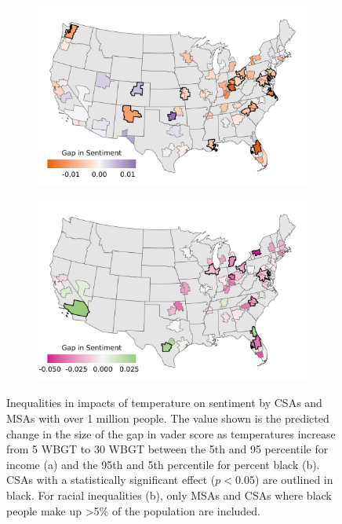 \documentclass{article}
\begin{document}
\begin{figure}[H]
\centering
\begin{subfigure}{0.75\textwidth}
  \includegraphics[width=\linewidth]{../res/map_wbgt_income.png}
  \caption{}
  \label{fig:map1}
\end{subfigure}
\begin{subfigure}{0.75\textwidth}
  \includegraphics[width=\linewidth]{../res/map_wbgt_black.png}
  \caption{}
  \label{fig:map2}
\end{subfigure}
\caption{Inequalities in impacts of temperature on sentiment by CSAs and MSAs with over 1 million people.  The value shown is the predicted change in the size of the gap in vader score as temperatures increase from 5 WBGT to 30 WBGT between the 5th and 95 percentile for income (a) and the 95th and 5th percentile for percent black (b).  CSAs with a statistically significant effect ($p < 0.05$) are outlined in black.  For racial inequalities (b), only MSAs and CSAs where black people make up >5\% of the population are included.}
\label{fig:test}
\end{figure}
\end{document}
